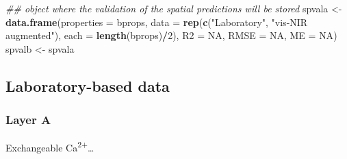 \documentclass[]{book}
\newenvironment{Shaded}{\begin{snugshade}}{\end{snugshade}}
\newcommand{\CommentTok}[1]{\textcolor[rgb]{0.56,0.35,0.01}{\textit{#1}}}
\newcommand{\DataTypeTok}[1]{\textcolor[rgb]{0.13,0.29,0.53}{#1}}
\newcommand{\DecValTok}[1]{\textcolor[rgb]{0.00,0.00,0.81}{#1}}
\newcommand{\FloatTok}[1]{\textcolor[rgb]{0.00,0.00,0.81}{#1}}
\newcommand{\KeywordTok}[1]{\textcolor[rgb]{0.13,0.29,0.53}{\textbf{#1}}}
\newcommand{\NormalTok}[1]{#1}
\newcommand{\OperatorTok}[1]{\textcolor[rgb]{0.81,0.36,0.00}{\textbf{#1}}}
\newcommand{\OtherTok}[1]{\textcolor[rgb]{0.56,0.35,0.01}{#1}}
\newcommand{\StringTok}[1]{\textcolor[rgb]{0.31,0.60,0.02}{#1}}
\begin{document}
\begin{Shaded}
\begin{Highlighting}[]
\CommentTok{## object where the validation of the spatial predictions will be stored}
\NormalTok{spvala <-}\StringTok{ }\KeywordTok{data.frame}\NormalTok{(}\DataTypeTok{properties =}\NormalTok{ bprops, }\DataTypeTok{data =} \KeywordTok{rep}\NormalTok{(}\KeywordTok{c}\NormalTok{(}\StringTok{"Laboratory"}\NormalTok{, }\StringTok{"vis-NIR augmented"}\NormalTok{), }
                    \DataTypeTok{each =} \KeywordTok{length}\NormalTok{(bprops)}\OperatorTok{/}\DecValTok{2}\NormalTok{), }\DataTypeTok{R2 =} \OtherTok{NA}\NormalTok{, }\DataTypeTok{RMSE =} \OtherTok{NA}\NormalTok{, }\DataTypeTok{ME =} \OtherTok{NA}\NormalTok{)}
\NormalTok{spvalb <-}\StringTok{ }\NormalTok{spvala}
\end{Highlighting}
\end{Shaded}

\hypertarget{laboratory-based-data-1}{%
\subsection{Laboratory-based data}\label{laboratory-based-data-1}}

\hypertarget{layer-a-2}{%
\subsubsection{Layer A}\label{layer-a-2}}

Exchangeable Ca\textsuperscript{2+}\ldots{}

\begin{Shaded}
\end{Shaded}
\end{document}
